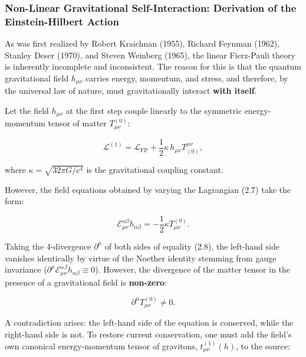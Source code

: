 \documentclass[11pt,a4paper]{article}
\theoremstyle{definition}
\begin{document}
\subsubsection{Non-Linear Gravitational Self-Interaction: Derivation of the Einstein-Hilbert Action}\label{sec:2.1.2}

As was first realized by Robert Kraichnan \cite{ref13} (1955), Richard Feynman (1962), Stanley Deser \cite{ref14} (1970), and Steven Weinberg (1965), the linear Fierz-Pauli theory is inherently incomplete and inconsistent. The reason for this is that the quantum gravitational field $h_{\mu\nu}$ carries energy, momentum, and stress, and therefore, by the universal law of nature, must gravitationally interact \textbf{with itself}.

Let the field $h_{\mu\nu}$ at the first step couple linearly to the symmetric energy-momentum tensor of matter $T_{\mu\nu}^{(0)}$:

\begin{equation}\label{eq:2.7}\tag{2.7}
\mathcal{L}^{(1)} = \mathcal{L}_{\text{FP}} + \frac{1}{2}\kappa \, h_{\mu\nu} T^{\mu\nu}_{(0)},
\end{equation}

where $\kappa = \sqrt{32\pi G / c^4}$ is the gravitational coupling constant.

However, the field equations obtained by varying the Lagrangian (2.7) take the form:

\begin{equation}\label{eq:2.8}\tag{2.8}
\mathcal{E}_{\mu\nu}^{\alpha\beta} h_{\alpha\beta} = -\frac{1}{2}\kappa T_{\mu\nu}^{(0)}.
\end{equation}

Taking the 4-divergence $\partial^\mu$ of both sides of equality (2.8), the left-hand side vanishes identically by virtue of the Noether identity stemming from gauge invariance ($\partial^\mu \mathcal{E}_{\mu\nu}^{\alpha\beta} h_{\alpha\beta} \equiv 0$). However, the divergence of the matter tensor in the presence of a gravitational field is \textbf{non-zero}:

\begin{equation}\label{eq:2.9}\tag{2.9}
\partial^\mu T_{\mu\nu}^{(0)} \ne 0.
\end{equation}

A contradiction arises: the left-hand side of the equation is conserved, while the right-hand side is not. To restore current conservation, one must add the field's own canonical energy-momentum tensor of gravitons, $t_{\mu\nu}^{(1)}(h)$, to the source:
\end{document}
